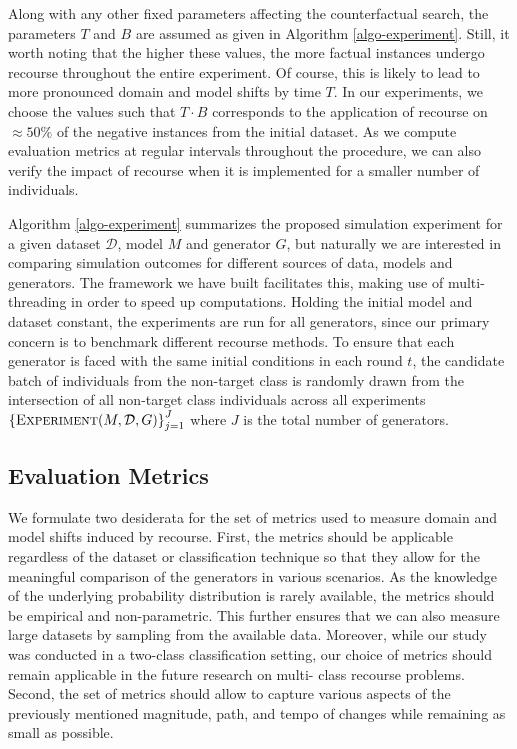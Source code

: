 \documentclass[conference,final,]{IEEEtran}
\theoremstyle{definition}
\theoremstyle{definition}
\theoremstyle{definition}
\theoremstyle{definition}
\theoremstyle{remark}
\begin{document}
Along with any other fixed parameters affecting the counterfactual search, the parameters \(T\) and \(B\) are assumed as given in Algorithm \ref{algo-experiment}. Still, it worth noting that the higher these values, the more factual instances undergo recourse throughout the entire experiment. Of course, this is likely to lead to more pronounced domain and model shifts by time \(T\). In our experiments, we choose the values such that \(T \cdot B\) corresponds to the application of recourse on \(\approx50\%\) of the negative instances from the initial dataset. As we compute evaluation metrics at regular intervals throughout the procedure, we can also verify the impact of recourse when it is implemented for a smaller number of individuals.

Algorithm \ref{algo-experiment} summarizes the proposed simulation experiment for a given dataset \(\mathcal{D}\), model \(M\) and generator \(G\), but naturally we are interested in comparing simulation outcomes for different sources of data, models and generators. The framework we have built facilitates this, making use of multi-threading in order to speed up computations. Holding the initial model and dataset constant, the experiments are run for all generators, since our primary concern is to benchmark different recourse methods. To ensure that each generator is faced with the same initial conditions in each round \(t\), the candidate batch of individuals from the non-target class is randomly drawn from the intersection of all non-target class individuals across all experiments \(\left\{\textsc{Experiment}(M,\mathcal{D},G)\right\}_{j=1}^J\) where \(J\) is the total number of generators.

\hypertarget{method-2-metrics}{%
\subsection{Evaluation Metrics}\label{method-2-metrics}}

We formulate two desiderata for the set of metrics used to measure domain and model shifts induced by recourse. First, the metrics should be applicable regardless of the dataset or classification technique so that they allow for the meaningful comparison of the generators in various scenarios. As the knowledge of the underlying probability distribution is rarely available, the metrics should be empirical and non-parametric. This further ensures that we can also measure large datasets by sampling from the available data. Moreover, while our study was conducted in a two-class classification setting, our choice of metrics should remain applicable in the future research on multi- class recourse problems. Second, the set of metrics should allow to capture various aspects of the previously mentioned magnitude, path, and tempo of changes while remaining as small as possible.
\end{document}
